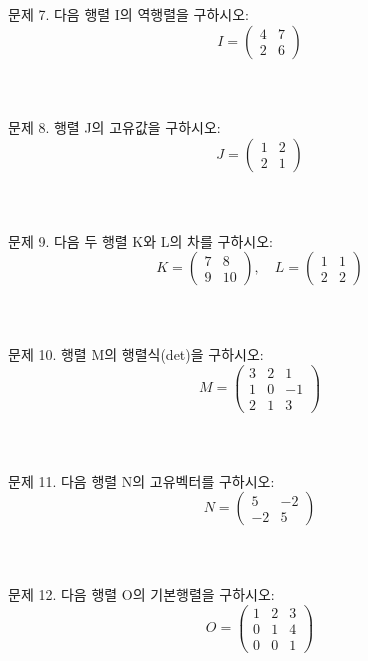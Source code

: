 \documentclass[fleqn]{article}
\begin{document}
\noindent 문제 7. 다음 행렬 I의 역행렬을 구하시오:  
\[ I = \begin{pmatrix} 4 & 7 \\ 2 & 6 \end{pmatrix} \]  
\\\\\\

\noindent 문제 8. 행렬 J의 고유값을 구하시오:  
\[ J = \begin{pmatrix} 1 & 2 \\ 2 & 1 \end{pmatrix} \]  
\\\\\\

\noindent 문제 9. 다음 두 행렬 K와 L의 차를 구하시오:  
\[ K = \begin{pmatrix} 7 & 8 \\ 9 & 10 \end{pmatrix}, \quad L = \begin{pmatrix} 1 & 1 \\ 2 & 2 \end{pmatrix} \]  
\\\\\\

\noindent 문제 10. 행렬 M의 행렬식(det)을 구하시오:  
\[ M = \begin{pmatrix} 3 & 2 & 1 \\ 1 & 0 & -1 \\ 2 & 1 & 3 \end{pmatrix} \]  
\\\\\\


\noindent 문제 11. 다음 행렬 N의 고유벡터를 구하시오:  
\[ N = \begin{pmatrix} 5 & -2 \\ -2 & 5 \end{pmatrix} \]  
\\\\\\

\noindent 문제 12. 다음 행렬 O의 기본행렬을 구하시오:  
\[ O = \begin{pmatrix} 1 & 2 & 3 \\ 0 & 1 & 4 \\ 0 & 0 & 1 \end{pmatrix} \]  
\\\\\\
\end{document}
